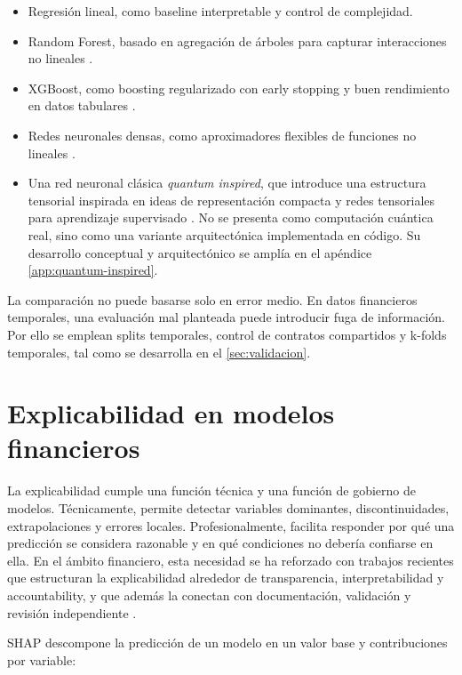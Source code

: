 \begin{itemize}
  \item Regresión lineal, como baseline interpretable y control de complejidad.
  \item Random Forest, basado en agregación de árboles para capturar interacciones no lineales \citep{breiman2001random}.
  \item XGBoost, como boosting regularizado con early stopping y buen rendimiento en datos tabulares \citep{chen2016xgboost}.
  \item Redes neuronales densas, como aproximadores flexibles de funciones no lineales \citep{hornik1989multilayer}.
  \item Una red neuronal clásica \emph{quantum inspired}, que introduce una estructura tensorial inspirada en ideas de representación compacta y redes tensoriales para aprendizaje supervisado \citep{stoudenmire2016supervised,novikov2015tensorizing}. No se presenta como computación cuántica real, sino como una variante arquitectónica implementada en código. Su desarrollo conceptual y arquitectónico se amplía en el apéndice \ref{app:quantum-inspired}.
\end{itemize}

La comparación no puede basarse solo en error medio. En datos financieros temporales, una evaluación mal planteada puede introducir fuga de información. Por ello se emplean splits temporales, control de contratos compartidos y k-folds temporales, tal como se desarrolla en el \autoref{sec:validacion}.


\section{Explicabilidad en modelos financieros}
\label{sec:xai}

La explicabilidad cumple una función técnica y una función de gobierno de modelos. Técnicamente, permite detectar variables dominantes, discontinuidades, extrapolaciones y errores locales. Profesionalmente, facilita responder por qué una predicción se considera razonable y en qué condiciones no debería confiarse en ella. En el ámbito financiero, esta necesidad se ha reforzado con trabajos recientes que estructuran la explicabilidad alrededor de transparencia, interpretabilidad y accountability, y que además la conectan con documentación, validación y revisión independiente \citep{solaimani2025beyond,perezcruz2025managing}.

SHAP descompone la predicción de un modelo en un valor base y contribuciones por variable:

